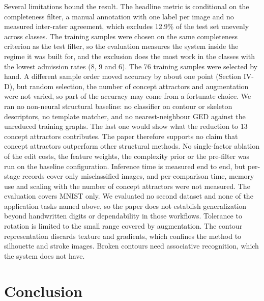 Several limitations bound the result. The headline metric is conditional on the
completeness filter, a manual annotation with one label per image and no
measured inter-rater agreement, which excludes 12.9\% of the test set unevenly
across classes. The training samples were chosen on the same completeness
criterion as the test filter, so the evaluation measures the system inside the
regime it was built for, and the exclusion does the most work in the classes
with the lowest admission rates (8, 9 and 6). The 76 training samples were
selected by hand. A different sample order moved accuracy by about one point
(Section IV-D), but random selection, the number of concept attractors and
augmentation were not varied, so part of the accuracy may come from a fortunate
choice. We ran no non-neural structural baseline: no classifier on contour or
skeleton descriptors, no template matcher, and no nearest-neighbour GED against
the unreduced training graphs. The last one would show what the reduction to 13
concept attractors contributes. The paper therefore supports no claim that
concept attractors outperform other structural methods. No single-factor
ablation of the edit costs, the feature weights, the complexity prior or the
pre-filter was run on the baseline configuration. Inference time is measured
end to end, but per-stage records cover only misclassified images, and
per-comparison time, memory use and scaling with the number of concept
attractors were not measured. The evaluation covers MNIST only. We evaluated no
second dataset and none of the application tasks named above, so the paper
does not establish generalization beyond handwritten digits or dependability in
those workflows. Tolerance to rotation
is limited to the small range covered by augmentation. The contour representation
discards texture and gradients, which confines the method to silhouette and
stroke images. Broken contours need associative
recognition, which the system does not have.

\section{Conclusion}

